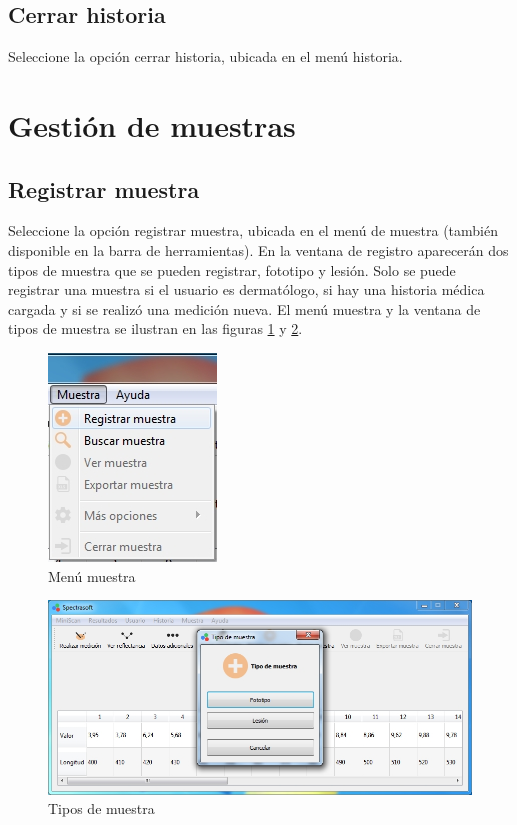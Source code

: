 	\subsection*{Cerrar historia}
	
	Seleccione la opci\'{o}n cerrar historia, ubicada en el men\'{u} historia.

\newpage

\section*{Gesti\'{o}n de muestras}

	\subsection*{Registrar muestra}
	
	Seleccione la opci\'{o}n registrar muestra, ubicada en el men\'{u} de muestra (tambi\'{e}n disponible en la barra de herramientas). En la ventana de registro aparecer\'{a}n dos tipos de muestra que se pueden registrar, fototipo y lesi\'{o}n. Solo se puede registrar una muestra si el usuario es dermat\'{o}logo, si hay una historia m\'{e}dica cargada y si se realiz\'{o} una medici\'{o}n nueva. El men\'{u} muestra y la ventana de tipos de muestra se ilustran en las figuras \ref{fig:menu-muestra} y \ref{fig:tipos-muestra}.
	
\begin{figure}[H]
  \centering
  \includegraphics[width=.3\linewidth]{./img/menu-muestra.jpg}
\caption[]{Men\'{u} muestra\label{fig:menu-muestra}}
\end{figure}

\begin{figure}[H]
  \centering
  \includegraphics[width=.8\linewidth]{./img/tipo-muestra.jpg}
\caption[]{Tipos de muestra\label{fig:tipos-muestra}}
\end{figure}
	
